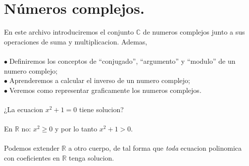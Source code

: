 \documentclass{article}
\theoremstyle{definition}
\theoremstyle{definition}
\theoremstyle{remark}
\newcommand\bl{$\bullet\;$}
\begin{document}
  \section{Números complejos.}
  En este archivo introduciremos el conjunto $\mathbb{C}$ de numeros complejos junto a sus operaciones de suma y multiplicacion. Ademas, \\\\
  \bl Definiremos los conceptos de ``conjugado'', ``argumento'' y ``modulo'' de un numero complejo; \\
  \bl Aprenderemos a calcular el inverso de un numero complejo; \\ 
  \bl Veremos como representar graficamente los numeros complejos.
\\\\
¿La ecuacion $x^2+1=0$ tiene solucion? \\\\
En $\mathbb{R}$ no: $x^2 \geq 0$ y por lo tanto $x^2+1>0$.\\\\

Podemos extender $\mathbb{R}$ a otro cuerpo, de tal forma que \emph{toda} ecuacion polinomica con coeficientes en $\mathbb{R}$ tenga solucion.
\end{document}
